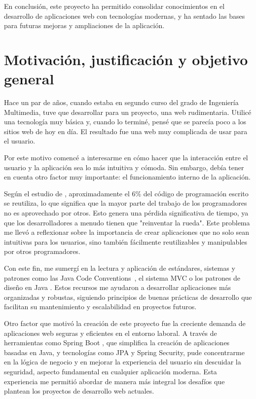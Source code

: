\documentclass[draft]{scrbook}
\begin{document}
En conclusión, este proyecto ha permitido consolidar conocimientos en el desarrollo de aplicaciones web con tecnologías modernas, y ha sentado las bases para futuras mejoras y ampliaciones de la aplicación.




\chapter*{Motivación, justificación y objetivo general}
\thispagestyle{empty}

Hace un par de años, cuando estaba en segundo curso del grado de Ingeniería Multimedia, tuve que desarrollar para un proyecto, una web rudimentaria. Utilicé una tecnología muy básica y, cuando lo terminé, pensé que se parecía poco a los sitios web de hoy en día. El resultado fue una web muy complicada de usar para el usuario.

Por este motivo comencé a interesarme en cómo hacer que la interacción entre el usuario y la aplicación sea lo más intuitiva y cómoda. Sin embargo, debía tener en cuenta otro factor muy importante: el funcionamiento interno de la aplicación.

Según el estudio de 
\textcite{CHEN2024111964}, aproximadamente el 6\% del código de programación escrito se reutiliza, lo que significa que la mayor parte del trabajo de los programadores no es aprovechado por otros. Esto genera una pérdida significativa de tiempo, ya que los desarrolladores a menudo tienen que "reinventar la rueda". Este problema me llevó a reflexionar sobre la importancia de crear aplicaciones que no solo sean intuitivas para los usuarios, sino también fácilmente reutilizables y manipulables por otros programadores.

Con este fin, me sumergí en la lectura y aplicación de estándares, sistemas y patrones como las Java Code Conventions~\autocite{Microsystems1997},
el sistema MVC \autocite{MVC}
o los patrones de diseño en Java \autocite{java-patterns}
. Estos recursos me ayudaron a desarrollar aplicaciones más organizadas y robustas, siguiendo principios de buenas prácticas de desarrollo que facilitan su mantenimiento y escalabilidad en proyectos futuros.

Otro factor que motivó la creación de este proyecto fue la creciente demanda de aplicaciones web seguras y eficientes en el entorno laboral. A través de herramientas como Spring Boot \autocite{spring-boot-def} 
, que simplifica la creación de aplicaciones basadas en Java, y tecnologías como JPA y Spring Security, pude concentrarme en la lógica de negocio y en mejorar la experiencia del usuario sin descuidar la seguridad, aspecto fundamental en cualquier aplicación moderna. Esta experiencia me permitió abordar de manera más integral los desafíos que plantean los proyectos de desarrollo web actuales.
\end{document}
